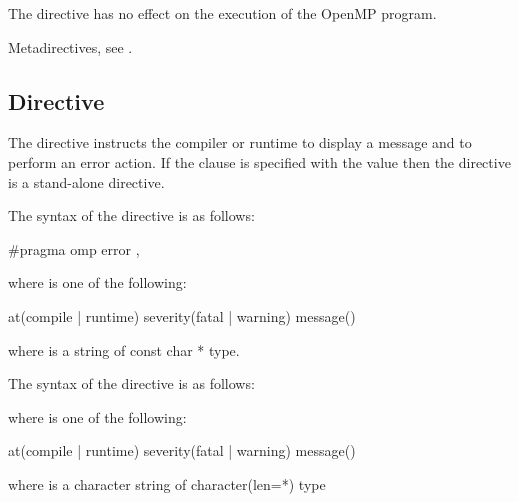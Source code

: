 \descr

The  directive has no effect on the execution of 
the OpenMP program. 

\begin{crossrefs}
\item Metadirectives, see .
\end{crossrefs}



\subsection{ Directive}
\label{subsec:error Directive}
\summary
The  directive instructs the compiler or runtime to display
a message and to perform an error action. If the  clause is
specified with the  value then the  directive 
is a stand-alone directive.

\syntax
\begin{ccppspecific}
\begin{samepage}
The syntax of the  directive is as follows:

\begin{ompcPragma}
#pragma omp error \plc{[clause[ [},\plc{] clause] ... ] new-line}
\end{ompcPragma}
\end{samepage}

\begin{samepage}
where  is one of the following{}:

\begin{indentedcodelist}
at(compile | runtime)
severity(fatal | warning)
message()
\end{indentedcodelist}

where  is a string of const char * type.
\end{samepage}
\end{ccppspecific}

\begin{fortranspecific}
\begin{samepage}
The syntax of the  directive is as follows:

\end{samepage}

\begin{samepage}
where  is one of the following{}:

\begin{indentedcodelist}
at(compile | runtime)
severity(fatal | warning)
message()
\end{indentedcodelist}

where  is a character string of character(len=*) type
\end{samepage}
\end{fortranspecific}

